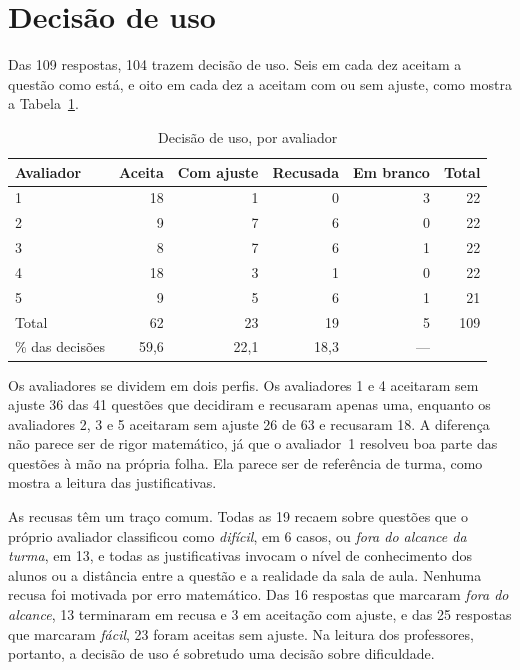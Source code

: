 \section{Decisão de uso}
\label{sub:rodada1-decisao}

Das 109 respostas, 104 trazem decisão de uso. Seis em cada dez aceitam a questão como está, e oito
em cada dez a aceitam com ou sem ajuste, como mostra a Tabela~\ref{tab:rodada1-decisao}.

\begin{table}[htbp]
  \centering
  \caption{Decisão de uso, por avaliador}
  \label{tab:rodada1-decisao}
  \begin{tabular}{lrrrrr}
    \toprule
    Avaliador & Aceita & Com ajuste & Recusada & Em branco & Total \\
    \midrule
    1 & 18 & 1 & 0 & 3 & 22 \\
    2 & 9 & 7 & 6 & 0 & 22 \\
    3 & 8 & 7 & 6 & 1 & 22 \\
    4 & 18 & 3 & 1 & 0 & 22 \\
    5 & 9 & 5 & 6 & 1 & 21 \\
    \midrule
    Total & 62 & 23 & 19 & 5 & 109 \\
    \% das decisões & 59,6 & 22,1 & 18,3 & --- & \\
    \bottomrule
  \end{tabular}
\end{table}

Os avaliadores se dividem em dois perfis. Os avaliadores 1 e 4 aceitaram sem ajuste 36 das 41
questões que decidiram e recusaram apenas uma, enquanto os avaliadores 2, 3 e 5 aceitaram sem
ajuste 26 de 63 e recusaram 18. A diferença não parece ser de rigor matemático, já que o
avaliador~1 resolveu boa parte das questões à mão na própria folha. Ela parece ser de referência de
turma, como mostra a leitura das justificativas.

As recusas têm um traço comum. Todas as 19 recaem sobre questões que o próprio avaliador
classificou como \emph{difícil}, em 6 casos, ou \emph{fora do alcance da turma}, em 13, e todas as
justificativas invocam o nível de conhecimento dos alunos ou a distância entre a questão e a
realidade da sala de aula. Nenhuma recusa foi motivada por erro matemático. Das 16 respostas que
marcaram \emph{fora do alcance}, 13 terminaram em recusa e 3 em aceitação com ajuste, e das 25
respostas que marcaram \emph{fácil}, 23 foram aceitas sem ajuste. Na leitura dos professores,
portanto, a decisão de uso é sobretudo uma decisão sobre dificuldade.

